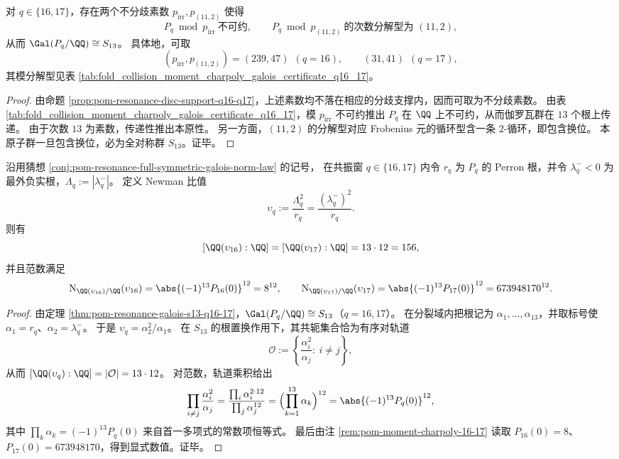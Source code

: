 \begin{proposition}[两素数证书锁定 \texorpdfstring{$S_{13}$}{S13}（\texorpdfstring{$q=16,17$}{q=16,17}）]\label{prop:pom-resonance-s13-two-prime-certificate-q16-q17}
对 \(q\in\{16,17\}\)，存在两个不分歧素数 \(p_{\mathrm{irr}},p_{(11,2)}\) 使得
\[
P_q\bmod p_{\mathrm{irr}}\ \text{不可约},\qquad
P_q\bmod p_{(11,2)}\ \text{的次数分解型为 }(11,2),
\]
从而 \(\Gal(P_q/\QQ)\cong S_{13}\)。
具体地，可取
\[
(p_{\mathrm{irr}},p_{(11,2)})=
(239,47)\ \ (q=16),
\qquad
(31,41)\ \ (q=17),
\]
其模分解型见表 \ref{tab:fold_collision_moment_charpoly_galois_certificate_q16_17}。
\end{proposition}
\begin{proof}
由命题 \ref{prop:pom-resonance-disc-support-q16-q17}，上述素数均不落在相应的分歧支撑内，因而可取为不分歧素数。
由表 \ref{tab:fold_collision_moment_charpoly_galois_certificate_q16_17}，模 \(p_{\mathrm{irr}}\) 不可约推出 \(P_q\) 在 \(\QQ\) 上不可约，从而伽罗瓦群在 \(13\) 个根上传递。
由于次数 \(13\) 为素数，传递性推出本原性。
另一方面，\((11,2)\) 的分解型对应 Frobenius 元的循环型含一条 \(2\)-循环，即包含换位。
本原子群一旦包含换位，必为全对称群 \(S_{13}\)。证毕。
\end{proof}

\begin{theorem}[Newman 比值的次数与范数律在 \texorpdfstring{$q=16,17$}{q=16,17} 的特化]\label{thm:pom-resonance-newman-uq-degree-norm-q16-q17}
沿用猜想 \ref{conj:pom-resonance-full-symmetric-galois-norm-law} 的记号，
在共振窗 \(q\in\{16,17\}\) 内令 \(r_q\) 为 \(P_q\) 的 Perron 根，并令 \(\lambda_q^-<0\) 为最外负实根，\(\Lambda_q:=|\lambda_q^-|\)。
定义 Newman 比值
\[
\upsilon_q:=\frac{\Lambda_q^2}{r_q}=\frac{(\lambda_q^-)^2}{r_q}.
\]
则有
\[
[\QQ(\upsilon_{16}):\QQ]=[\QQ(\upsilon_{17}):\QQ]=13\cdot 12=156,
\]
并且范数满足
\[
\mathrm{N}_{\QQ(\upsilon_{16})/\QQ}(\upsilon_{16})=\abs{(-1)^{13}P_{16}(0)}^{12}=8^{12},
\qquad
\mathrm{N}_{\QQ(\upsilon_{17})/\QQ}(\upsilon_{17})=\abs{(-1)^{13}P_{17}(0)}^{12}=673948170^{12}.
\]
\end{theorem}
\begin{proof}
由定理 \ref{thm:pom-resonance-galois-s13-q16-17}，\(\Gal(P_q/\QQ)\cong S_{13}\)（\(q=16,17\)）。
在分裂域内把根记为 \(\alpha_1,\dots,\alpha_{13}\)，并取标号使 \(\alpha_1=r_q\)、\(\alpha_2=\lambda_q^-\)。
于是
\(
\upsilon_q=\alpha_2^2/\alpha_1
\)。
在 \(S_{13}\) 的根置换作用下，其共轭集合恰为有序对轨道
\[
\mathcal{O}:=\left\{\frac{\alpha_i^2}{\alpha_j}:\ i\ne j\right\},
\]
从而 \([\QQ(\upsilon_q):\QQ]=|\mathcal{O}|=13\cdot 12\)。
对范数，轨道乘积给出
\[
\prod_{i\ne j}\frac{\alpha_i^2}{\alpha_j}
=\frac{\prod_i \alpha_i^{2\cdot 12}}{\prod_j \alpha_j^{12}}
=\Bigl(\prod_{k=1}^{13}\alpha_k\Bigr)^{12}
=\abs{(-1)^{13}P_q(0)}^{12},
\]
其中 \(\prod_k\alpha_k=(-1)^{13}P_q(0)\) 来自首一多项式的常数项恒等式。
最后由注 \ref{rem:pom-moment-charpoly-16-17} 读取 \(P_{16}(0)=8\)、\(P_{17}(0)=673948170\)，得到显式数值。证毕。
\end{proof}

